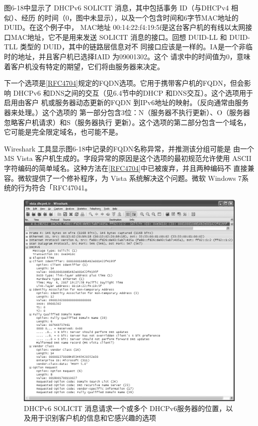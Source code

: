 图6-18中显示了 DHCPv6 SOLICIT 消息，其中包括事务 ID（与DHCPv4 相似）、经历
的时间（0，图中未显示），以及一个包含时间和6字节MAC地址的DUID。在这个例子中，
MAC地址 00:14:22:f4:19:5f是这台客户机的有线以太网接口MAC地址，它不是用来发送
SOLICIT 消息的接口。回想 DUID-LL 和 DUID-TLL 类型的 DUID，其中的链路层信息对不
同接口应该是一样的。IA是一个非临时的地址，并且客户机已选择IAID 为09001302。这个
请求中的时间值为0，意味着客户机没有特定的期望，它们将由服务器来决定。

下一个选项是\href{https://www.rfc-editor.org/rfc/rfc4704}{\href{https://www.rfc-editor.org/rfc/rfc4704}{[RFC4704]}}规定的FQDN选项。它用于携带客户机的FQDN，但会影响
DHCPv6 和DNS之间的交互（见6.4节中的DHCP 和DNS交互）。这个选项用于启用由客户
机或服务器动态更新的FQDN 到IPv6地址的映射。（反向通常由服务器来处理。）这个选项的
第一部分包含3位：N（服务器不执行更新）、O（服务器忽略客户机请求）和S（服务器执行
更新）。这个选项的第二部分包含一个域名，它可能是完全限定域名，也可能不是。

\begin{tcolorbox}
    Wireshark 工具显示图6-18中记录的FQDN名称异常，并推测该分组可能是
    由一个 MS Vista 客户机生成的。字段异常的原因是这个选项的最初规范允许使用
    ASCII 字符编码的简单域名。这种方法在\href{https://www.rfc-editor.org/rfc/rfc4704}{\href{https://www.rfc-editor.org/rfc/rfc4704}{[RFC4704]}}中已被废弃，并且两种编码不
    直接兼容。微软提供了一个修补程序，为 Vista 系统解决这个问题。微软 Windows
    7系统的行为符合「RFC47041。
\end{tcolorbox}

\begin{figure}[H]
    \centering
	\includegraphics[scale=0.5]{imgs/6/6-18.png}
	\caption{DHCPv6 SOLICIT 消息请求一个或多个 DHCPv6服务器的位置，以及用于识别客户机的信息和它感兴趣的选项}
\end{figure}

